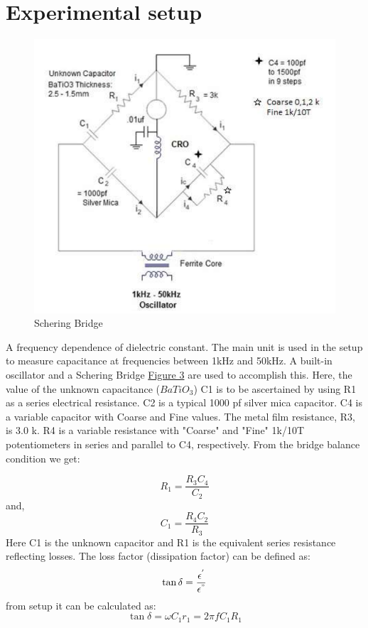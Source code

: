 \section{Experimental setup}
  	\begin{figure}[H]
		\centering
		\label{fig:setup}
		\includegraphics[width=0.7\columnwidth]{images/t5.png}
		\caption{Schering Bridge}
	\end{figure}

	A frequency dependence of dielectric constant. The main unit is used in the setup to measure capacitance at frequencies between 1kHz and 50kHz. A built-in oscillator and a Schering Bridge \hyperref[fig:setup]{Figure 3} are used to accomplish this. Here, the value of the unknown capacitance ($BaTiO_3$) C1 is to be ascertained by using R1 as a series electrical resistance. C2 is a typical 1000 pf silver mica capacitor. C4 is a variable capacitor with Coarse and Fine values. The metal film resistance, R3, is 3.0 k. R4 is a variable resistance with "Coarse" and "Fine" 1k/10T potentiometers in series and parallel to C4, respectively. From the bridge balance condition we get:
	
	$$R_1=\frac{R_3 C_4}{C_2}$$
	and,
	$$ C_1=\frac{R_4 C_2}{R_3}$$
	Here C1 is the unknown capacitor and R1 is the equivalent series resistance reflecting losses. The loss factor (dissipation factor) can	be defined as:
	$$\tan\delta=\frac{\epsilon^{'}}{\epsilon^"}$$
	from setup it can be calculated as:
	$$\tan\delta=\omega C_1r_1 = 2\pi fC_1R_1$$
